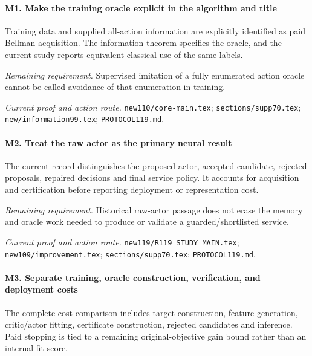 \paragraph{M1. Make the training oracle explicit in the algorithm and title}

Training data and supplied all-action information are explicitly identified as paid Bellman acquisition. The information theorem specifies the oracle, and the current study reports equivalent classical use of the same labels.

\par\emph{Remaining requirement.} Supervised imitation of a fully enumerated action oracle cannot be called avoidance of that enumeration in training.

\par\emph{Current proof and action route.} \nolinkurl{new110/core-main.tex}; \nolinkurl{sections/supp70.tex}; \nolinkurl{new/information99.tex}; \nolinkurl{PROTOCOL119.md}.

\paragraph{M2. Treat the raw actor as the primary neural result}

The current record distinguishes the proposed actor, accepted candidate, rejected proposals, repaired decisions and final service policy. It accounts for acquisition and certification before reporting deployment or representation cost.

\par\emph{Remaining requirement.} Historical raw-actor passage does not erase the memory and oracle work needed to produce or validate a guarded/\allowbreak{}shortlisted service.

\par\emph{Current proof and action route.} \nolinkurl{new119/R119_STUDY_MAIN.tex}; \nolinkurl{new109/improvement.tex}; \nolinkurl{sections/supp70.tex}; \nolinkurl{PROTOCOL119.md}.

\paragraph{M3. Separate training, oracle construction, verification, and deployment costs}

The complete-cost comparison includes target construction, feature generation, critic/\allowbreak{}actor fitting, certificate construction, rejected candidates and inference. Paid stopping is tied to a remaining original-objective gain bound rather than an internal fit score.

